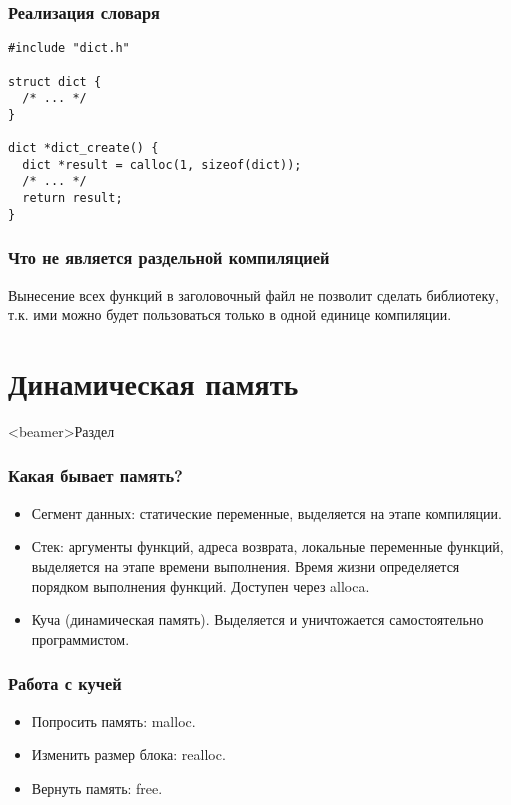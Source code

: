 \documentclass[hyperref={unicode=true}]{beamer}
\begin{document}
\begin{frame}[fragile]
\frametitle{Реализация словаря}
\begin{lstlisting}
#include "dict.h"

struct dict {
  /* ... */
}

dict *dict_create() {
  dict *result = calloc(1, sizeof(dict));
  /* ... */
  return result;
}
\end{lstlisting}
\end{frame}

\begin{frame}
\frametitle{Что не является раздельной компиляцией}
Вынесение всех функций в заголовочный файл не позволит сделать
библиотеку, т.к. ими можно будет пользоваться только в одной единице
компиляции. 
\end{frame}

\section{Динамическая память}
  \begin{frame}<beamer>{Раздел}
  \end{frame}

\begin{frame}
\frametitle{Какая бывает память?}
\begin{itemize}
\item Сегмент данных: статические переменные, выделяется на этапе компиляции. 
\item Стек: аргументы функций, адреса возврата, локальные переменные
  функций, выделяется на этапе времени выполнения. Время жизни определяется порядком
  выполнения функций. Доступен через alloca.
\item Куча (динамическая память). Выделяется и уничтожается
  самостоятельно программистом. 
\end{itemize}
\end{frame}

\begin{frame}
\frametitle{Работа с кучей}
\begin{itemize}
\item Попросить память: malloc. 
\item Изменить размер блока: realloc.
\item Вернуть память: free. 
\end{itemize}
\end{frame}
\end{document}
